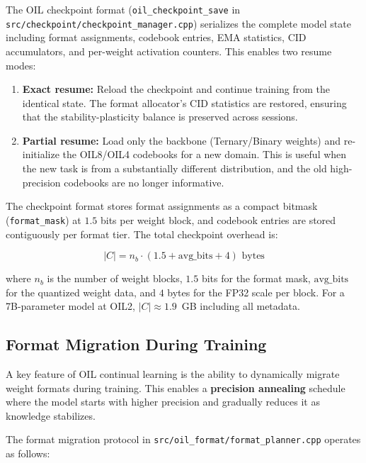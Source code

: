 The OIL checkpoint format (\texttt{oil\_checkpoint\_save} in \texttt{src/checkpoint/checkpoint\_manager.cpp}) serializes the complete model state including format assignments, codebook entries, EMA statistics, CID accumulators, and per-weight activation counters. This enables two resume modes:

\begin{enumerate}
    \item \textbf{Exact resume:} Reload the checkpoint and continue training from the identical state. The format allocator's CID statistics are restored, ensuring that the stability-plasticity balance is preserved across sessions.
    \item \textbf{Partial resume:} Load only the backbone (Ternary/Binary weights) and re-initialize the OIL8/OIL4 codebooks for a new domain. This is useful when the new task is from a substantially different distribution, and the old high-precision codebooks are no longer informative.
\end{enumerate}

The checkpoint format stores format assignments as a compact bitmask (\texttt{format\_mask}) at $1.5$ bits per weight block, and codebook entries are stored contiguously per format tier. The total checkpoint overhead is:

$$|C| = n_b \cdot (1.5 + \text{avg\_bits} + 4) \text{ bytes}$$

where $n_b$ is the number of weight blocks, $1.5$ bits for the format mask, $\text{avg\_bits}$ for the quantized weight data, and $4$ bytes for the FP32 scale per block. For a 7B-parameter model at OIL2, $|C| \approx 1.9$~GB including all metadata.

\subsection{Format Migration During Training}
\label{sec:format_migration}

A key feature of OIL continual learning is the ability to dynamically migrate weight formats during training. This enables a \textbf{precision annealing} schedule where the model starts with higher precision and gradually reduces it as knowledge stabilizes.

The format migration protocol in \texttt{src/oil\_format/format\_planner.cpp} operates as follows:

